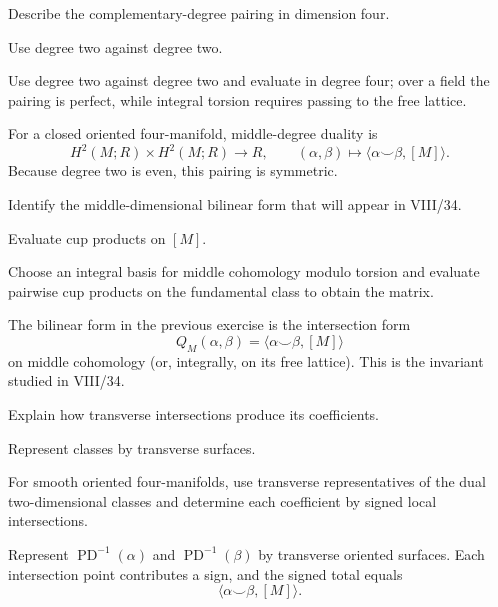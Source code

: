 \begin{exercise}\label{exr:viii33-21}
Describe the complementary-degree pairing in dimension four.
\end{exercise}
\begin{hint}
Use degree two against degree two.

Use degree two against degree two and evaluate in degree four; over a field the pairing is perfect, while integral torsion requires passing to the free lattice.
\end{hint}
\begin{solution}
For a closed oriented four-manifold, middle-degree duality is
\[
H^2(M;R)\times H^2(M;R)\to R,\qquad
(\alpha,\beta)\mapsto\langle\alpha\smile\beta,[M]\rangle.
\]
Because degree two is even, this pairing is symmetric.
\end{solution}

\begin{exercise}\label{exr:viii33-22}
Identify the middle-dimensional bilinear form that will appear in VIII/34.
\end{exercise}
\begin{hint}
Evaluate cup products on $[M]$.

Choose an integral basis for middle cohomology modulo torsion and evaluate pairwise cup products on the fundamental class to obtain the matrix.
\end{hint}
\begin{solution}
The bilinear form in the previous exercise is the intersection form
\[
Q_M(\alpha,\beta)=\langle\alpha\smile\beta,[M]\rangle
\]
on middle cohomology (or, integrally, on its free lattice). This is the invariant studied in VIII/34.
\end{solution}

\begin{exercise}\label{exr:viii33-23}
Explain how transverse intersections produce its coefficients.
\end{exercise}
\begin{hint}
Represent classes by transverse surfaces.

For smooth oriented four-manifolds, use transverse representatives of the dual two-dimensional classes and determine each coefficient by signed local intersections.
\end{hint}
\begin{solution}
Represent \(\operatorname{PD}^{-1}(\alpha)\) and \(\operatorname{PD}^{-1}(\beta)\) by transverse oriented surfaces. Each intersection point contributes a sign, and the signed total equals
\[
\langle\alpha\smile\beta,[M]\rangle.
\]
\end{solution}

